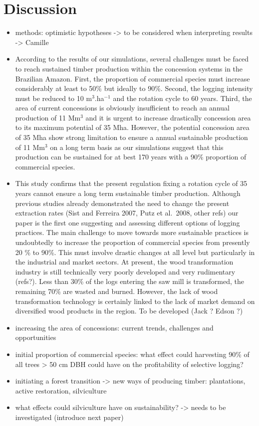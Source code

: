 \documentclass[
]{article}
\begin{document}
\hypertarget{discussion}{%
\section{Discussion}\label{discussion}}

\begin{itemize}
\item
  methods: optimistic hypotheses -\textgreater{} to be considered when interpreting results -\textgreater{} Camille
\item
  According to the results of our simulations, several challenges must be faced to reach sustained timber production within the concession systems in the Brazilian Amazon. First, the proportion of commercial species must increase considerably at least to 50\% but ideally to 90\%. Second, the logging intensity must be reduced to 10 m\(^3\).ha\(^{-1}\) and the rotation cycle to 60 years. Third, the area of current concessions is obviously insufficient to reach an annual production of 11 Mm\(^3\) and it is urgent to increase drastically concession area to its maximum potential of 35 Mha. However, the potential concession area of 35 Mha show strong limitation to ensure a annual sustainable production of 11 Mm\(^3\) on a long term basis as our simulations suggest that this production can be sustained for at best 170 years with a 90\% proportion of commercial species.
\item
  This study confirms that the present regulation fixing a rotation cycle of 35 years cannot ensure a long term sustainable timber production. Although previous studies already demonstrated the need to change the present extraction rates (Sist and Ferreira 2007, Putz et al.~2008, other refs) our paper is the first one suggesting and assessing different options of logging practices. The main challenge to move towards more sustainable practices is undoubtedly to increase the proportion of commercial species from presently 20 \% to 90\%. This must involve drastic changes at all level but particularly in the industrial and market sectors. At present, the wood transformation industry is still technically very poorly developed and very rudimentary (refs?). Less than 30\% of the logs entering the saw mill is transformed, the remaining 70\% are wasted and burned. However, the lack of wood transformation technology is certainly linked to the lack of market demand on diversified wood products in the region. To be developed (Jack ? Edson ?)
\item
  increasing the area of concessions: current trends, challenges and opportunities
\item
  initial proportion of commercial species: what effect could harvesting 90\% of all trees \textgreater{} 50 cm DBH could have on the profitability of selective logging?
\item
  initiating a forest transition -\textgreater{} new ways of producing timber: plantations, active restoration, silviculture
\item
  what effects could silviculture have on sustainability? -\textgreater{} needs to be investigated (introduce next paper)
\end{itemize}
\end{document}

